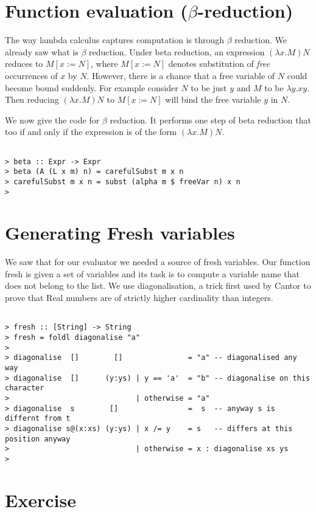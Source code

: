 \documentclass{article}
\begin{document}
\section{Function evaluation ($\beta$-reduction)}

The way lambda calculus captures computation is through $\beta$
reduction. We already saw what is $\beta$ reduction. Under beta
reduction, an expression $(\lambda x . M) N$ reduces to $M [x := N]$,
where $M[x:=N]$ denotes substitution of \emph{free} occurrences of $x$
by $N$. However, there is a chance that a free variable of $N$ could
become bound suddenly. For example consider $N$ to be just $y$ and $M$
to be $\lambda y. x y$. Then reducing $(\lambda x . M) N$ to $M[x := N]$
will bind the free variable $y$ in $N$.

We now give the code for $\beta$ reduction. It performs one step of beta
reduction that too if and only if the expression is of the form
$(\lambda x . M) N$.

\begin{verbatim}

> beta :: Expr -> Expr
> beta (A (L x m) n) = carefulSubst m x n
> carefulSubst m x n = subst (alpha m $ freeVar n) x n
> 
\end{verbatim}
\section{Generating Fresh variables}

We saw that for our evaluator we needed a source of fresh variables. Our
function fresh is given a set of variables and its task is to compute a
variable name that does not belong to the list. We use diagonalisation,
a trick first used by Cantor to prove that Real numbers are of strictly
higher cardinality than integers.

\begin{verbatim}

> fresh :: [String] -> String
> fresh = foldl diagonalise "a"
>
> diagonalise  []        []               = "a" -- diagonalised any way
> diagonalise  []      (y:ys) | y == 'a'  = "b" -- diagonalise on this character
>                             | otherwise = "a" 
> diagonalise  s        []                =  s  -- anyway s is differnt from t
> diagonalise s@(x:xs) (y:ys) | x /= y    = s   -- differs at this position anyway
>                             | otherwise = x : diagonalise xs ys
>
\end{verbatim}
\section{Exercise}
\end{document}
